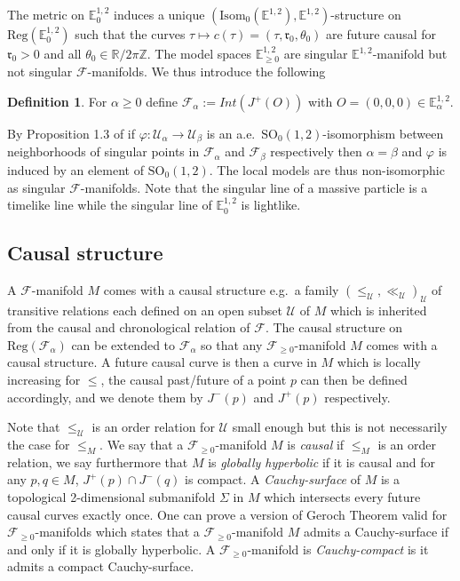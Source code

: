 \documentclass[a4paper,12pt]{article}
\def\ZZ{\mathbb{Z}}
\def\r{\mathfrak{r}}
\def\U{\mathcal U}
\def\GGL{\SO_0(1,2)}
\def\isom{Isom}
\def\SO{\mathrm{SO}}
\def\RR{\mathbb{R}}
\newcommand{\mass}[1]{{\mathbb E}^{1,2}_{#1}}
\def\isom{\mathrm{Isom}}
\def\Reg{\mathrm{Reg}}
\def\reg{\Reg}
\def\SO{\mathrm{SO}}
\def\Future{\mathcal F}
\def\isom{\mathrm{Isom}}
\def\reg{\mathrm{Reg}}
\def\U{\mathcal{U}}
\def\Reg{\mathrm{Reg}}
\def\r{\mathfrak{r}}
\def\GG{\isom_0(\mass{})}
\theoremstyle{definition}
\newtheorem{defi}[lem]{Definition}	%
\begin{document}
		The metric on $\mass{0}$ induces a unique $(\GG,\mass{})$-structure on $\reg(\mass{0})$ such that the curves $\tau\mapsto c(\tau)=(\tau,\r_0,\theta_0)$ are future causal for $\r_0>0$ and all $\theta_0\in \RR/2\pi\ZZ$.
		The model spaces $\mass{\geq0}$ are singular $\mass{}$-manifold but not singular $\Future$-manifolds. We thus introduce the following
		
		\begin{defi} For $\alpha\geq 0$ define $\Future_\alpha:= Int(J^+(O))$ with $O=(0,0,0)\in \mass{\alpha}$.
		\end{defi}
		
		By Proposition 1.3 of \cite{brunswic2021Cauchy} if $\varphi:\U_\alpha\rightarrow \U_\beta$ is an a.e.\ $\GGL$-isomorphism between neighborhoods of singular points in $\Future_\alpha$ and $\Future_\beta$ respectively then $\alpha=\beta$ and $\varphi$ is induced by an element of $\GGL$. The local models are thus non-isomorphic as singular $\Future$-manifolds.
		Note that the singular line of a massive particle is a timelike line while the singular line of $\mass{0}$ is lightlike. 
		
		
	
    
		
		
		
		
		\subsection{Causal structure}
			A $\Future$-manifold $M$ comes with a causal structure e.g.\ a family $(\leq_\U,\ll_\U)_{\U}$ of transitive relations each defined on an open subset $\U$ of $M$ which is inherited from the causal and chronological relation of $\Future$. The causal structure on $\reg(\Future_\alpha)$ can be extended to $\Future_\alpha$ so that any $\Future_{\geq0}$-manifold $M$ comes with a causal structure.
			A future causal curve is then a curve in $M$ which is locally increasing for $\leq$, the causal past/future of a point $p$ can then be defined accordingly, and we denote them by $J^-(p)$ and $J^+(p)$ respectively.
			
			Note that $\leq_\U$ is an order relation for $\U$ small enough but this is not necessarily the case for $\leq_M$. We say that a $\Future_{\geq0}$-manifold $M$ is {\it causal} if $\leq_M$ is an order relation, we say furthermore that $M$ is {\it globally hyperbolic} if it is causal and for any $p,q\in M$, $J^+(p)\cap J^-(q)$ is compact. A {\it Cauchy-surface} of $M$ is a topological 2-dimensional submanifold $\Sigma$ in $M$ which intersects every future causal curves exactly once. One can prove a version of Geroch Theorem valid for $\Future_{\geq0}$-manifolds \cite{MR3783554} which states that a $\Future_{\geq0}$-manifold $M$ admits a Cauchy-surface if and only if it is globally hyperbolic. A $\Future_{\geq0}$-manifold is {\it Cauchy-compact} is it admits a compact Cauchy-surface.
			
\end{document}
